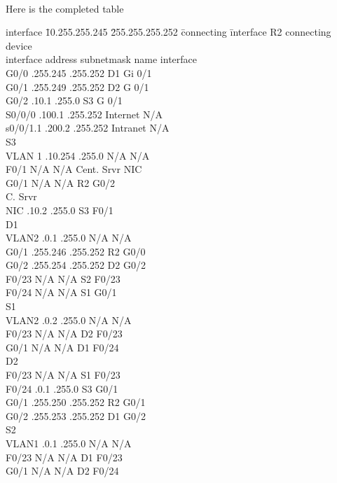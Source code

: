 \documentclass[../EngineeringJournal_CDavis.tex]{subfiles}
\begin{document}
\noindent{}\\
Here is the completed table
\begin{tabbing}
  interface \= 10.255.255.245 \= 255.255.255.252 \= connecting \= interface\kill
  R2 \> \> \> connecting \> device\\
interface \> address \> subnetmask \> name \> interface\\
G0/0 .255.245 .255.252 \> D1 \> Gi 0/1 \\
G0/1 .255.249 .255.252 \> D2 \> G 0/1 \\
G0/2 .10.1 .255.0 \> S3 \> G 0/1 \\
S0/0/0 .100.1 .255.252 \> Internet \> N/A \\
s0/0/1.1 .200.2 .255.252 \> Intranet \> N/A \\
S3 \>  \> \> \> \\
VLAN 1 .10.254 .255.0 \> N/A \> N/A \\
F0/1 \> N/A \> N/A \> Cent. Srvr \> NIC \\
G0/1 \> N/A \> N/A \> R2 \> G0/2 \\
C. Srvr \\ 
NIC .10.2 .255.0 \> S3 \> F0/1 \\
D1 \> \> \> \> \\
VLAN2 .0.1 .255.0 \> N/A \> N/A\\
G0/1 .255.246 .255.252 \> R2 \> G0/0 \\
G0/2 .255.254 .255.252 \> D2 \> G0/2 \\
F0/23 \> N/A \> N/A \> S2 \> F0/23 \\
F0/24\> N/A \> N/A \> S1 \> G0/1 \\
S1 \> \> \> \> \\
VLAN2 .0.2 .255.0 \> N/A \> N/A \\
F0/23 \> N/A \> N/A \> D2 \> F0/23 \\
G0/1 \> N/A \> N/A \> D1 \> F0/24 \\
D2 \> \> \> \> \\
F0/23 \> N/A \> N/A \> S1 \> F0/23 \\
F0/24 .0.1 .255.0 \> S3 \> G0/1 \\
G0/1 .255.250 .255.252 \> R2 \> G0/1 \\
G0/2 .255.253 .255.252 \> D1 \> G0/2 \\
S2 \> \> \> \> \\
VLAN1 .0.1 .255.0 \> N/A \> N/A \\
F0/23 \> N/A \> N/A \> D1 \> F0/23 \\
G0/1 \> N/A \> N/A \> D2 \> F0/24 
\end{tabbing}
\end{document}
